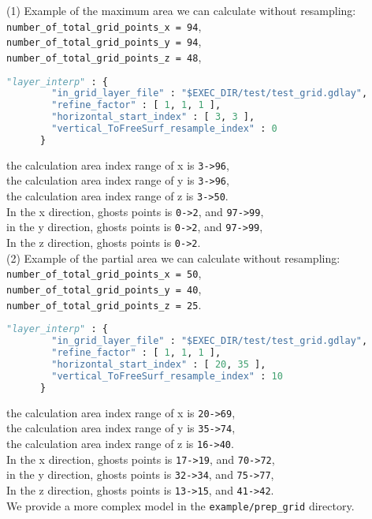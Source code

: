 (1) Example of the maximum area we can calculate without resampling: \\
\texttt{number\_of\_total\_grid\_points\_x = 94}, \\
\texttt{number\_of\_total\_grid\_points\_y = 94}, \\
\texttt{number\_of\_total\_grid\_points\_z = 48},  \\
\begin{lstlisting}[language=python, title=run\_test.sh, frame=tb]
      "layer_interp" : {
        "in_grid_layer_file" : "$EXEC_DIR/test/test_grid.gdlay",  
        "refine_factor" : [ 1, 1, 1 ],
        "horizontal_start_index" : [ 3, 3 ],
        "vertical_ToFreeSurf_resample_index" : 0
      }        
\end{lstlisting}
the calculation area index range of x is \texttt{3->96}, \\
the calculation area index range of y is \texttt{3->96}, \\
the calculation area index range of z is \texttt{3->50}. \\
In the x direction, ghosts points is \texttt{0->2}, and \texttt{97->99}, \\
in the y direction, ghosts points is \texttt{0->2}, and \texttt{97->99}, \\
In the z direction, ghosts points is \texttt{0->2}.\\

(2) Example of the partial area we can calculate without resampling: \\
\texttt{number\_of\_total\_grid\_points\_x = 50}, \\
\texttt{number\_of\_total\_grid\_points\_y = 40}, \\
\texttt{number\_of\_total\_grid\_points\_z = 25}.  \\
\begin{lstlisting}[language=python, title=run\_test.sh, frame=tb]
      "layer_interp" : {
        "in_grid_layer_file" : "$EXEC_DIR/test/test_grid.gdlay",  
        "refine_factor" : [ 1, 1, 1 ],
        "horizontal_start_index" : [ 20, 35 ],
        "vertical_ToFreeSurf_resample_index" : 10
      }        
\end{lstlisting}
the calculation area index range of x is \texttt{20->69}, \\
the calculation area index range of y is \texttt{35->74}, \\
the calculation area index range of z is \texttt{16->40}. \\
In the x direction, ghosts points is \texttt{17->19}, and \texttt{70->72}, \\
in the y direction, ghosts points is \texttt{32->34}, and \texttt{75->77}, \\
In the z direction, ghosts points is \texttt{13->15}, and \texttt{41->42}. \\

We provide a more complex model in the \texttt{example/prep\_grid} directory.

